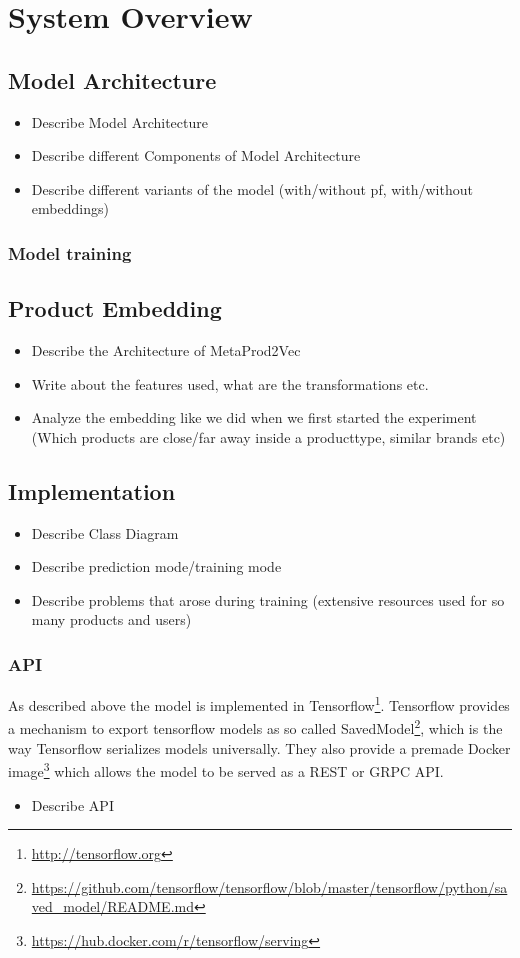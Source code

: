 \chapter{System Overview}

\section{Model Architecture}\label{model_arch}
\begin{itemize}
\item Describe Model Architecture
\item Describe different Components of Model Architecture
\item Describe different variants of the model (with/without pf, with/without embeddings)
\end{itemize}
\subsection{Model training}
\section{Product Embedding}
\begin{itemize}
    \item Describe the Architecture of MetaProd2Vec
    \item Write about the features used, what are the transformations etc.
    \item Analyze the embedding like we did when we first started the experiment (Which products are close/far away inside a producttype, similar brands etc)
\end{itemize}

\section{Implementation}

\begin{itemize}
\item Describe Class Diagram
\item Describe prediction mode/training mode
\item Describe problems that arose during training (extensive resources used for so many products and users)
\end{itemize}
\subsection{API}\label{api}
As described above the model is implemented in Tensorflow\footnote{\url{http://tensorflow.org}}.
Tensorflow provides a mechanism to export tensorflow models as so called SavedModel\footnote{\url{https://github.com/tensorflow/tensorflow/blob/master/tensorflow/python/saved_model/README.md}}, which is the way Tensorflow serializes models universally.
They also provide a premade Docker image\footnote{\url{https://hub.docker.com/r/tensorflow/serving}} which allows the model to be served as a REST or GRPC API.
\begin{itemize}
\item Describe API
\end{itemize}

